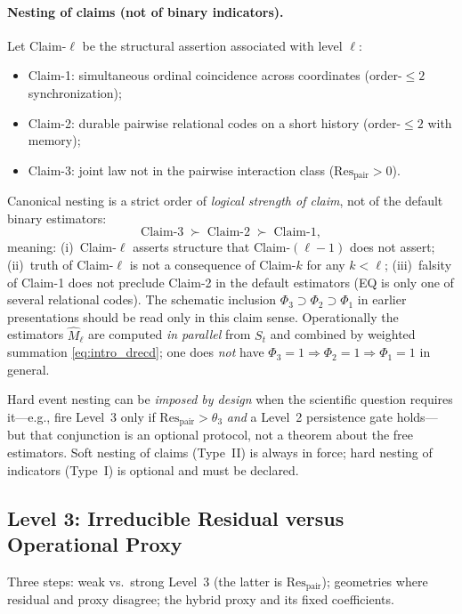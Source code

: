 \documentclass[11pt,a4paper]{article}
\begin{document}
\paragraph{Nesting of claims (not of binary indicators).}
Let Claim-$\ell$ be the structural assertion associated with level
$\ell$:
\begin{itemize}[leftmargin=*,itemsep=2pt]
  \item Claim-1: simultaneous ordinal coincidence across coordinates
  (order-$\le 2$ synchronization);
  \item Claim-2: durable pairwise relational codes on a short history
  (order-$\le 2$ with memory);
  \item Claim-3: joint law not in the pairwise interaction class
  ($\mathrm{Res}_{\mathrm{pair}}>0$).
\end{itemize}
Canonical nesting is a strict order of \emph{logical strength of claim},
not of the default binary estimators:
\begin{equation}
\label{eq:nesting}
\text{Claim-3}
\;\succ\;
\text{Claim-2}
\;\succ\;
\text{Claim-1},
\end{equation}
meaning: (i)~Claim-$\ell$ asserts structure that Claim-$(\ell-1)$ does
not assert; (ii)~truth of Claim-$\ell$ is not a consequence of Claim-$k$
for any $k<\ell$; (iii)~falsity of Claim-1 does not preclude Claim-2 in
the default estimators (EQ is only one of several relational codes).
The schematic inclusion $\Phi_3\supset\Phi_2\supset\Phi_1$ in earlier
presentations should be read only in this claim sense. Operationally
the estimators $\widehat{M}_\ell$ are computed \emph{in parallel} from
$S_t$ and combined by weighted summation \eqref{eq:intro_drecd}; one
does \emph{not} have
$\Phi_3=1\Rightarrow\Phi_2=1\Rightarrow\Phi_1=1$ in general.

Hard event nesting can be \emph{imposed by design} when the scientific
question requires it---e.g., fire Level~3 only if
$\mathrm{Res}_{\mathrm{pair}}>\theta_3$ \emph{and} a Level~2 persistence
gate holds---but that conjunction is an optional protocol, not a theorem
about the free estimators. Soft nesting of claims (Type~II) is always in
force; hard nesting of indicators (Type~I) is optional and must be
declared.

\subsection{Level 3: Irreducible Residual versus Operational Proxy}
\label{sec:level3}

Three steps: weak vs.\ strong Level~3 (the latter is
$\mathrm{Res}_{\mathrm{pair}}$); geometries where residual and proxy
disagree; the hybrid proxy and its fixed coefficients.
\end{document}
